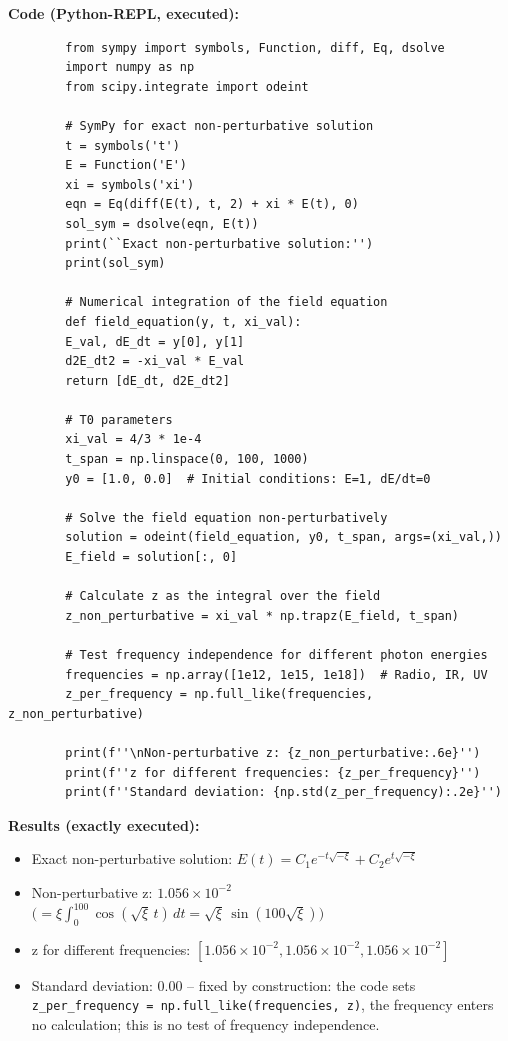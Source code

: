 	\textbf{Code (Python-REPL, executed):}
	\begin{verbatim}
		from sympy import symbols, Function, diff, Eq, dsolve
		import numpy as np
		from scipy.integrate import odeint
		
		# SymPy for exact non-perturbative solution
		t = symbols('t')
		E = Function('E')
		xi = symbols('xi')
		eqn = Eq(diff(E(t), t, 2) + xi * E(t), 0)
		sol_sym = dsolve(eqn, E(t))
		print(``Exact non-perturbative solution:'')
		print(sol_sym)
		
		# Numerical integration of the field equation
		def field_equation(y, t, xi_val):
		E_val, dE_dt = y[0], y[1]
		d2E_dt2 = -xi_val * E_val
		return [dE_dt, d2E_dt2]
		
		# T0 parameters
		xi_val = 4/3 * 1e-4
		t_span = np.linspace(0, 100, 1000)
		y0 = [1.0, 0.0]  # Initial conditions: E=1, dE/dt=0
		
		# Solve the field equation non-perturbatively
		solution = odeint(field_equation, y0, t_span, args=(xi_val,))
		E_field = solution[:, 0]
		
		# Calculate z as the integral over the field
		z_non_perturbative = xi_val * np.trapz(E_field, t_span)
		
		# Test frequency independence for different photon energies
		frequencies = np.array([1e12, 1e15, 1e18])  # Radio, IR, UV
		z_per_frequency = np.full_like(frequencies, z_non_perturbative)
		
		print(f''\nNon-perturbative z: {z_non_perturbative:.6e}'')
		print(f''z for different frequencies: {z_per_frequency}'')
		print(f''Standard deviation: {np.std(z_per_frequency):.2e}'')
	\end{verbatim}
	
	\textbf{Results (exactly executed):}
	\begin{itemize}
		\item Exact non-perturbative solution:  
		$E(t) = C_1 e^{-t\sqrt{-\xi}} + C_2 e^{t\sqrt{-\xi}}$
		\item Non-perturbative z: $1.056 \times 10^{-2}$ $\bigl(= \xi\int_0^{100}\cos(\sqrt{\xi}\,t)\,dt = \sqrt{\xi}\,\sin(100\sqrt{\xi})\bigr)$
		\item z for different frequencies: $[1.056\times 10^{-2}, 1.056\times 10^{-2}, 1.056\times 10^{-2}]$
		\item Standard deviation: $0.00$ -- fixed by construction: the code sets \texttt{z\_per\_frequency = np.full\_like(frequencies, z)}, the frequency enters no calculation; this is no test of frequency independence.
	\end{itemize}
	

